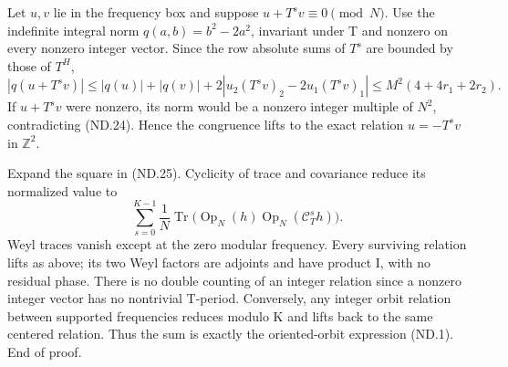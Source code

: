 Let \(u,v\) lie in the frequency box and suppose \(u+T^sv\equiv0\pmod N\). Use the indefinite integral norm \(q(a,b)=b^2-2a^2\), invariant under T and nonzero on every nonzero integer vector. Since the row absolute sums of \(T^s\) are bounded by those of \(T^H\), \[
 |q(u+T^sv)|
 \leq |q(u)|+|q(v)|+2|u_2(T^sv)_2-2u_1(T^sv)_1|
 \leq M^2(4+4r_1+2r_2).
\] If \(u+T^sv\) were nonzero, its norm would be a nonzero integer multiple of \(N^2\), contradicting (ND.24). Hence the congruence lifts to the exact relation \(u=-T^sv\) in \(\mathbb Z^2\).

Expand the square in (ND.25). Cyclicity of trace and covariance reduce its normalized value to \[
 \sum_{s=0}^{K-1}\frac1N\operatorname{Tr}
        \bigl(\operatorname{Op}_N(h)\operatorname{Op}_N(\mathcal C_T^s h)\bigr).
\] Weyl traces vanish except at the zero modular frequency. Every surviving relation lifts as above; its two Weyl factors are adjoints and have product I, with no residual phase. There is no double counting of an integer relation since a nonzero integer vector has no nontrivial T-period. Conversely, any integer orbit relation between supported frequencies reduces modulo K and lifts back to the same centered relation. Thus the sum is exactly the oriented-orbit expression (ND.1). End of proof.


